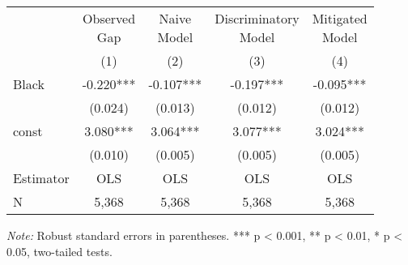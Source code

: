 \begin{tabular}{lcccc}
\toprule
&  \makecell{Observed \\ Gap} & \makecell{Naive \\ Model} &    \makecell{Discriminatory \\ Model} &   \makecell{Mitigated \\ Model}  \\
\cline{2-5}
{} &        (1) &        (2) &        (3) &        (4) \\
\midrule
Black              &  -0.220*** &  -0.107*** &  -0.197*** &  -0.095*** \\
                   &    (0.024) &    (0.013) &    (0.012) &    (0.012) \\
const              &   3.080*** &   3.064*** &   3.077*** &   3.024*** \\
                   &    (0.010) &    (0.005) &    (0.005) &    (0.005) \\
\midrule
Estimator          &        OLS &        OLS &        OLS &        OLS \\
\midrule
N                  &      5,368 &      5,368 &      5,368 &      5,368 \\
\bottomrule
\end{tabular}

\begin{singlespace} \noindent  \textit{Note:} Robust standard errors in parentheses. *** p < 0.001, ** p < 0.01, * p < 0.05, two-tailed tests.\end{singlespace}